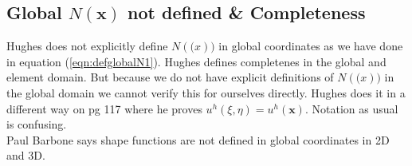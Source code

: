 \documentclass{article}
\begin{document}
\subsection{Global $N(\mathbf{x})$ not defined \& Completeness}
Hughes does not explicitly define $N(\mathbf(x))$ in global coordinates as we have done in equation (\ref{eqn:defglobalN1}). Hughes defines completenes in the global and element domain. But because we do not have explicit definitions of $N(\mathbf(x))$ in the global domain we cannot verify this for ourselves directly. Hughes does it in a different way on pg 117 where he proves $u^h(\xi,\eta)=u^h(\mathbf{x})$. Notation as usual is confusing.\\
Paul Barbone says shape functions are not defined in global coordinates in 2D and 3D. 
\end{document}
